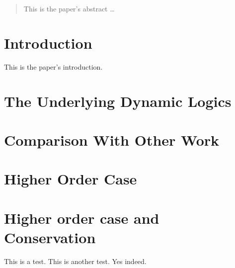 \documentclass[a4paper,12pt]{article}
\begin{document}
\maketitle

\begin{abstract}
This is the paper's abstract \ldots
\end{abstract}

\section{Introduction}
This is the paper's introduction.

\section{The Underlying Dynamic Logics}



\section{Comparison With Other Work}

\cite{GroenendijkStokhof:1991:Dynamic-Predicate-Logic}

\section{Higher Order Case}


\section{Higher order case and Conservation}


This is a test. This is another test. Yes indeed.




\end{document}
